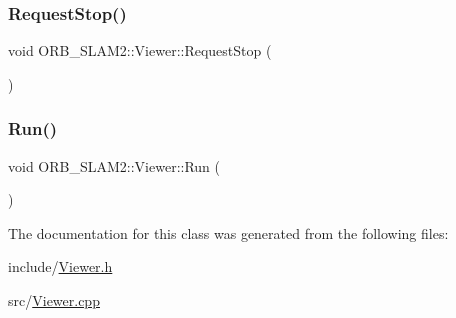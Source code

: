\subsubsection{\texorpdfstring{Request\+Stop()}{RequestStop()}}
{\footnotesize\ttfamily void O\+R\+B\+\_\+\+S\+L\+A\+M2\+::\+Viewer\+::\+Request\+Stop (\begin{DoxyParamCaption}{ }\end{DoxyParamCaption})}

\mbox{\label{class_o_r_b___s_l_a_m2_1_1_viewer_a68c269890714298034997be622f09947}} 
\subsubsection{\texorpdfstring{Run()}{Run()}}
{\footnotesize\ttfamily void O\+R\+B\+\_\+\+S\+L\+A\+M2\+::\+Viewer\+::\+Run (\begin{DoxyParamCaption}{ }\end{DoxyParamCaption})}



The documentation for this class was generated from the following files\+:\begin{DoxyCompactItemize}
\item 
include/\mbox{\hyperlink{_viewer_8h}{Viewer.\+h}}\item 
src/\mbox{\hyperlink{_viewer_8cpp}{Viewer.\+cpp}}\end{DoxyCompactItemize}
